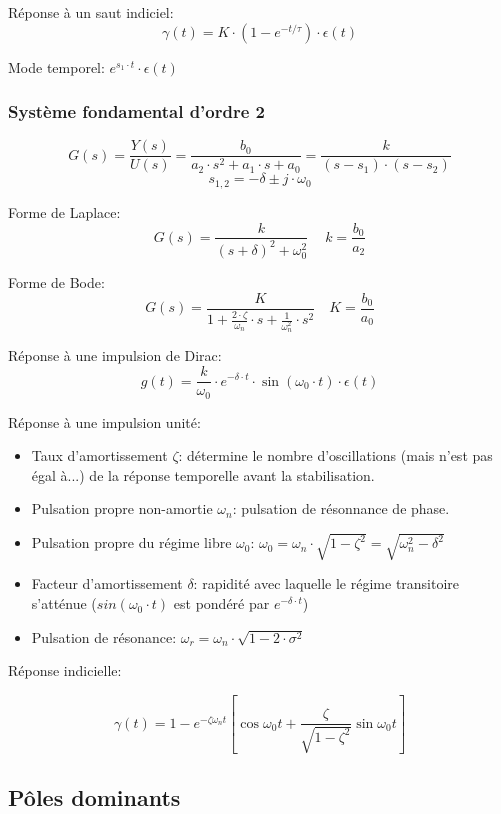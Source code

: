\documentclass[10pt, twocolumn]{article}
\begin{document}
				Réponse à un saut indiciel:
				\[\gamma(t) = K \cdot (1-e^{-t/\tau}) \cdot \epsilon (t)\]
				
				Mode temporel: $e^{s_1 \cdot t} \cdot \epsilon (t)$
				
			\subsubsection*{Système fondamental d'ordre 2}
				
				\[G(s)=\frac{Y(s)}{U(s)} =\frac{b_{0}}{a_{2} \cdot s^{2}+a_{1} \cdot s+a_{0}}=\frac{k}{(s-s_{1}) \cdot(s-s_{2})}\]
				\[s_{1,2}=-\delta \pm j \cdot \omega_{0}\]
				
				Forme de Laplace:
				\[G(s) = \frac{k}{(s+\delta)^{2}+\omega_{0}^{2}}\ \quad k=\frac{b_0}{a_2}\]
				
				Forme de Bode:
				\[G(s)=\frac{K}{1+\frac{2 \cdot \zeta}{\omega_{n}} \cdot s+\frac{1}{\omega_{n}^{2}} \cdot s^{2}} \quad K = \frac{b_0}{a_0}\]
				
				Réponse à une impulsion de Dirac:
				\[g(t)=\frac{k}{\omega_{0}} \cdot e^{-\delta \cdot t} \cdot \sin \left(\omega_{0} \cdot t\right) \cdot \epsilon(t)\]
				
				Réponse à une impulsion unité:
				
				\begin{itemize}
					\item Taux d'amortissement $\zeta$: détermine le nombre d'oscillations (mais n'est pas égal à...) de la réponse temporelle avant la stabilisation.
					\item Pulsation propre non-amortie $\omega _n$: pulsation de résonnance de phase.
					\item Pulsation propre du régime libre $\omega _0$: $\omega _0 = \omega _n \cdot \sqrt{1-\zeta ^2} = \sqrt{\omega_{n}^{2}-\delta^{2}}$
					\item Facteur d'amortissement $\delta$: rapidité avec laquelle le régime transitoire s'atténue ($sin (\omega _0 \cdot t)$ est pondéré par $e^{-\delta \cdot t}$)
					\item Pulsation de résonance: $\omega _r = \omega _n \cdot \sqrt{1-2\cdot\sigma^2}$
				\end{itemize}
				
				Réponse indicielle:
				
				\[\gamma(t) = 1-e^{-\zeta \omega_{n} t}\left[\cos \omega_{0} t+\frac{\zeta}{\sqrt{1-\zeta^{2}}} \sin \omega_{0} t\right]\]
				
		\subsection*{Pôles dominants}
			
\end{document}
